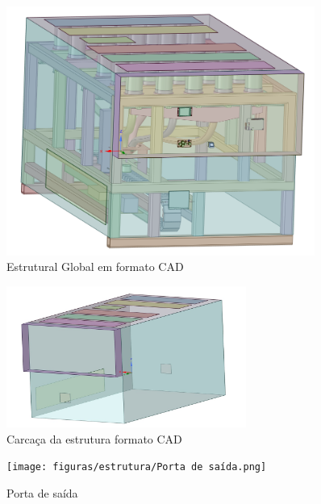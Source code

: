 \begin{apendicesenv}
\begin{figure}[H]
    \centering
    \includegraphics[width=0.9\textwidth]{figuras/estrutura/Design/Vista completa com circuitaria.png}
    \caption{Estrutural Global em formato CAD}
    \label{fig:global}
\end{figure}

\begin{figure}[H]
    \centering
    \includegraphics[width=0.7\textwidth]{figuras/estrutura/Design/ChapasExterior.jpeg}
    \caption{Carcaça da estrutura formato CAD}
    \label{fig:Carcaca}
\end{figure}

\begin{figure}[H]
    \centering
    \texttt{[image: figuras/estrutura/Porta de saída.png]}
    \caption{Porta de saída}
    \label{fig:portas}
\end{figure}


\end{apendicesenv}
